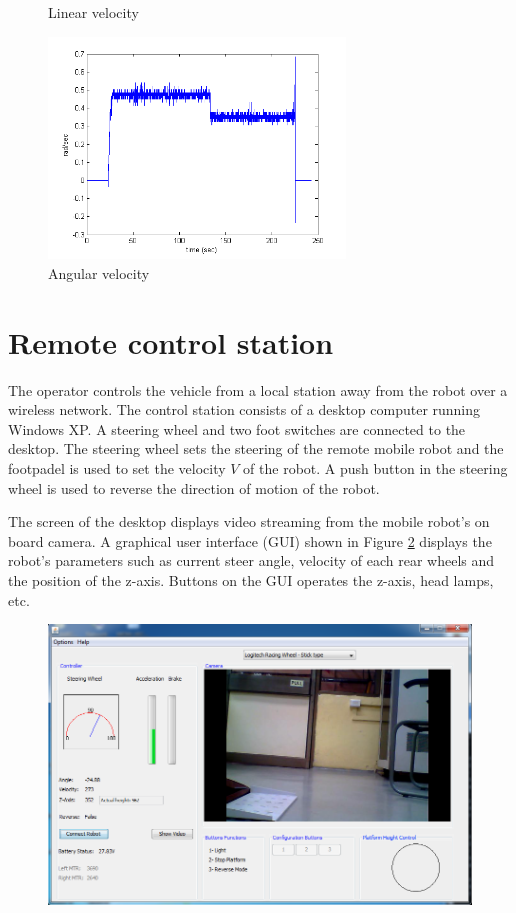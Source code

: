 \begin{figure}
\begin{minipage}[t]{0.5\textwidth}
	\caption{Linear velocity}\label{fig:cirVel}
\end{minipage}
\hfill
\begin{minipage}[t]{0.5\textwidth}
	\centering
	\includegraphics[width=3.1in]{Chapter5/fig/cirOmega} 
	\caption{Angular velocity}\label{fig:cirOmega}
\end{minipage}
\end{figure}

\section{ Remote control station}   
The operator controls the vehicle from a local station away from the robot over a wireless network. The control station consists of a desktop computer running Windows XP. A steering wheel and two foot switches are connected to the desktop. The steering wheel sets the steering of the remote mobile robot and the footpadel is used to set the velocity $V$ of the robot. A push button in the steering wheel is used to reverse the direction of motion of the robot.

The screen of the desktop displays  video streaming  from the mobile robot's on board camera. A graphical user  interface (GUI) shown in Figure \ref{fig:Gui} displays the robot's parameters such as current steer angle, velocity of each rear wheels and the position of the z-axis. Buttons on the GUI operates the z-axis, head lamps, etc.

\begin{figure}
	\includegraphics[width=\linewidth,keepaspectratio]{Chapter5/fig/gui}
	\label{fig:Gui} 
\end{figure}


